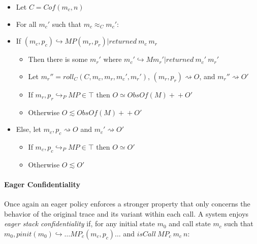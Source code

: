 \documentclass{article}
\begin{document}
      \begin{itemize}
        \item Let \(C = \mathit{Cof}(m_c,n)\)
        \item For all \(m_c'\) such that \(m_c \approx_C m_c'\):
        \item If \((m_c,p_c) \hookrightarrow MP (m_r,p_r) | \mathit{returned}\ m_c\ m_r\)
          \begin{itemize}
            \item Then there is some \(m_r'\) where
              \(m_c' \hookrightarrow M m_r' | \mathit{returned}\ m_c'\ m_r'\)
            \item Let \(m_r'' = \mathit{roll}_C(C,m_c,m_r,m_c',m_r')\),
              \((m_r,p_r) \rightsquigarrow O\), and \(m_r'' \rightsquigarrow O'\)
            \item If \(m_r,p_r \hookrightarrow_P MP \in \top\) then \(O \simeq \mathit{ObsOf}(M) +\!\!\!+ O'\)
            \item Otherwise \(O \lesssim \mathit{ObsOf}(M) +\!\!\!+ O'\)
          \end{itemize}
        \item Else, let \(m_c,p_c \rightsquigarrow O\) and \(m_c' \rightsquigarrow O'\)
          \begin{itemize}
            \item If \(m_c,p_c \hookrightarrow_P MP \in \top\) then \(O \simeq O'\)
            \item Otherwise \(O \lesssim O'\)
          \end{itemize}
      \end{itemize}

    \paragraph{Eager Confidentiality}

      Once again an eager policy enforces a stronger property that only concerns the behavior of
      the original trace and its variant within each call. A system enjoys {\it eager stack
      confidentiality} if, for any initial state \(m_0\) and call state \(m_c\) such that
      \(m_0,\mathit{pinit}(m_0) \hookrightarrow \dots MP_c (m_c,p_c) \dots\) and
      \(\mathit{isCall}\ MP_c\ m_c\ n\):
\end{document}
